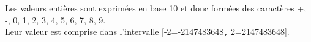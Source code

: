 Les valeurs entières sont exprimées en base 10 et donc formées des caractères +, -, 0, 1, 2, 3, 4, 5, 6, 7, 8, 9.\\
Leur valeur est comprise dans l'intervalle [-2=-2147483648\verb|,| 2=2147483648].
